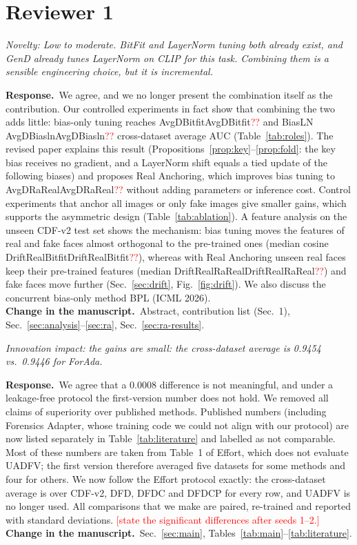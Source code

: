 \documentclass[11pt]{article}
\newif\ifpending\pendingtrue
\newcommand{\pending}[1]{\ifpending\textcolor{red}{[#1]}\else\errmessage{pending: #1}\fi}
\newcommand{\num}[1]{\ifcsname #1\endcsname\csname #1\endcsname\else\textcolor{red}{??}\fi}
\newenvironment{comment}{\par\medskip\noindent\begin{minipage}{\linewidth}\color{black!70}\itshape}{\end{minipage}\par\smallskip}
\newcommand{\resp}{\noindent\textbf{Response.}~}
\newcommand{\change}{\noindent\textbf{Change in the manuscript.}~}
\begin{document}
\section*{Reviewer 1}

\begin{comment}
Novelty: Low to moderate. BitFit and LayerNorm tuning both already exist, and GenD already tunes LayerNorm on CLIP for this task. Combining them is a sensible engineering choice, but it is incremental.
\end{comment}
\resp We agree, and we no longer present the combination itself as the contribution. Our controlled experiments in fact show that combining the two adds little: bias-only tuning reaches \num{AvgDBitfit} and BiasLN \num{AvgDBiasln} cross-dataset average AUC (Table~\ref{tab:roles}). The revised paper explains this result (Propositions~\ref{prop:key}--\ref{prop:fold}: the key bias receives no gradient, and a LayerNorm shift equals a tied update of the following biases) and proposes Real Anchoring, which improves bias tuning to \num{AvgDRaReal} without adding parameters or inference cost. Control experiments that anchor all images or only fake images give smaller gains, which supports the asymmetric design (Table~\ref{tab:ablation}). A feature analysis on the unseen CDF-v2 test set shows the mechanism: bias tuning moves the features of real and fake faces almost orthogonal to the pre-trained ones (median cosine \num{DriftRealBitfit}), whereas with Real Anchoring unseen real faces keep their pre-trained features (median \num{DriftRealRaReal}) and fake faces move further (Sec.~\ref{sec:drift}, Fig.~\ref{fig:drift}). We also discuss the concurrent bias-only method BPL (ICML 2026).\\
\change Abstract, contribution list (Sec.~1), Sec.~\ref{sec:analysis}--\ref{sec:ra}, Sec.~\ref{sec:ra-results}.

\begin{comment}
Innovation impact: the gains are small: the cross-dataset average is 0.9454 vs.\ 0.9446 for ForAda.
\end{comment}
\resp We agree that a 0.0008 difference is not meaningful, and under a leakage-free protocol the first-version number does not hold. We removed all claims of superiority over published methods. Published numbers (including Forensics Adapter, whose training code we could not align with our protocol) are now listed separately in Table~\ref{tab:literature} and labelled as not comparable. Most of these numbers are taken from Table~1 of Effort, which does not evaluate UADFV; the first version therefore averaged five datasets for some methods and four for others. We now follow the Effort protocol exactly: the cross-dataset average is over CDF-v2, DFD, DFDC and DFDCP for every row, and UADFV is no longer used. All comparisons that we make are paired, re-trained and reported with standard deviations. \pending{state the significant differences after seeds 1--2.}\\
\change Sec.~\ref{sec:main}, Tables~\ref{tab:main}--\ref{tab:literature}.
\end{document}
